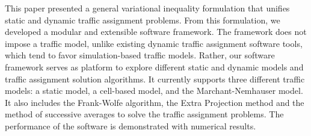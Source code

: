 This paper presented a general variational inequality formulation that unifies static and dynamic traffic assignment problems. From this formulation, we developed a modular and extensible software framework. The framework does not impose a traffic model, unlike existing dynamic traffic assignment software tools, which tend to favor simulation-based traffic models. Rather, our software framework serves as platform to explore different static and dynamic models and traffic assignment solution algorithms. It currently supports three different traffic models: a static model, a cell-based model, and the Marchant-Nemhauser model. It also includes the Frank-Wolfe algorithm, the Extra Projection method and the method of successive averages to solve the traffic assignment problems. The performance of the software is demonstrated with numerical results. 